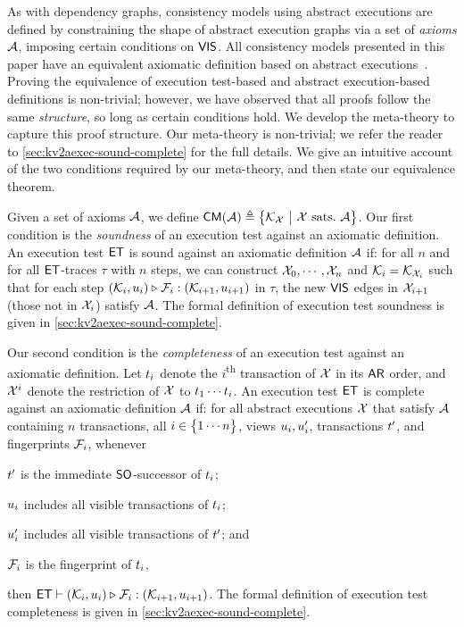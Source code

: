 As with dependency graphs, consistency models using abstract executions are defined by constraining the shape of abstract execution graphs via a set of \emph{axioms} $\mathcal{A}$, \eg imposing certain conditions on $\mathsf{VIS}$. %
All consistency models presented in this paper have an equivalent axiomatic definition based on abstract executions~\cite{framework-concur,laws}. 
Proving the equivalence of execution test-based and abstract execution-based definitions is non-trivial; 
however, we have observed that all proofs follow the same \emph{structure}, so long as certain conditions hold. 
We develop the meta-theory to capture this proof structure.
Our meta-theory is non-trivial; we refer the reader to \cref{sec:kv2aexec-sound-complete} for the full details. 
We give an intuitive account of the two conditions required by our meta-theory, and then state our equivalence theorem. 

Given a set of axioms $\mathcal{A}$, we define $\CMs(\Ax) \defeq \Set{\mkvs_\aexec }[ \aexec \text{ sats.} \ \Ax ]$.
Our first condition is the \emph{soundness} of an execution test against an axiomatic definition.
An execution test $\mathsf{ET}$ is sound against an axiomatic definition $\mathcal{A}$ if:
for all $n$ and for all \( \mathsf{ET} \)-traces \( \tau \) with \( n \) steps, 
we can construct $\mathcal{X}_0, \cdots, \mathcal{X}_n$ and \( \mathcal{K}_i = \mathcal{K}_{\mathcal{X}_i} \) such that 
for each step \( (\mathcal{K}_i, u_i) \triangleright_{} \mathcal{F}_i : (\mathcal{K}_{i+1}, u_{i+1}) \) in \( \tau \),
the new $\mathsf{VIS}$ edges in \( \mathcal{X}_{i+1} \) (those not in $\mathcal{X}_i$)
satisfy \( \mathcal{A} \).
The formal definition of execution test soundness is given in \cref{sec:kv2aexec-sound-complete}.

Our second condition is the \emph{completeness} of an execution test against an axiomatic definition.
Let $t_i$ denote the $i$\textsuperscript{th} transaction of $\mathcal{X}$ in its $\mathsf{AR}$ order, and $\mathcal{X}^{i}$ denote the restriction of $\mathcal{X}$ to $t_1 \cdots t_i$. 
An execution test $\mathsf{ET}$ is complete against an axiomatic definition $\mathcal{A}$ if:
for all abstract executions \( \mathcal{X} \) that satisfy \( \mathcal{A} \) containing $n$ transactions, 
all $i \in \Set{1 \cdots n}$, views $u_i, u'_i$, transactions $t'$, and fingerprints $\mathcal{F}_i$,
whenever
\begin{enumerate*}
	\item $t'$ is the immediate $\mathsf{SO}$-successor of $t_i$;
	\item \( u_i \) includes all visible transactions of \( t_i \); 
	\item $u'_i$ includes all visible transactions of $t'$; and
	\item $\mathcal{F}_i$ is the fingerprint of $t_i$, 
\end{enumerate*} 
then $\mathsf{ET} \vdash (\mathcal{K}_i, u_i) \triangleright_{} \mathcal{F}_i : (\mathcal{K}_{i+1}, u_{i+1})$.
The formal definition of execution test completeness is given in \cref{sec:kv2aexec-sound-complete}.


